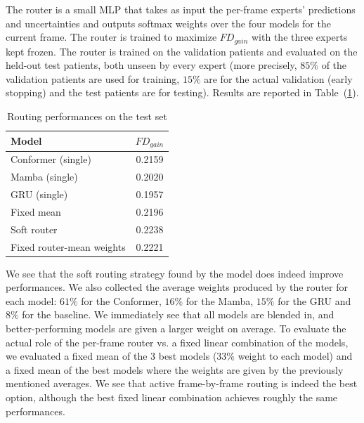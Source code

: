 \documentclass[
reprint,
aps,
prd,
superscriptaddress,
nofootinbib
]{revtex4-2}
\begin{document}
The router is a small MLP that takes as input the per-frame experts' predictions and uncertainties and outputs softmax weights over the four models for the current frame. The router is trained to maximize $FD_{gain}$ with the three experts kept frozen. The router is trained on the validation patients and evaluated on the held-out test patients, both unseen by every expert (more precisely, $85\%$ of the validation patients are used for training, $15\%$ are for the actual validation (early stopping) and the test patients are for testing). Results are reported in Table~(\ref{tab:routing-fd-gain}).

\begin{table}[h]
\centering
\begin{tabular}{lc}
\hline
Model & $FD_{gain}$ \\
\hline
Conformer (single) & 0.2159 \\
Mamba (single) & 0.2020 \\
GRU (single) & 0.1957 \\
\midrule
Fixed mean & 0.2196 \\
Soft router & 0.2238 \\
Fixed router-mean weights & 0.2221 \\
\hline
\end{tabular}
\caption{Routing performances on the test set}
\label{tab:routing-fd-gain}
\end{table}

We see that the soft routing strategy found by the model does indeed improve performances. We also collected the average weights produced by the router for each model: $61\%$ for the Conformer, $16\%$ for the Mamba, $15\%$ for the GRU and $8\%$ for the baseline. We immediately see that all models are blended in, and better-performing models are given a larger weight on average. To evaluate the actual role of the per-frame router vs. a fixed linear combination of the models, we evaluated a fixed mean of the 3 best models ($33\%$ weight to each model) and a fixed mean of the best models where the weights are given by the previously mentioned averages. We see that active frame-by-frame routing is indeed the best option, although the best fixed linear combination achieves roughly the same performances.
\end{document}
